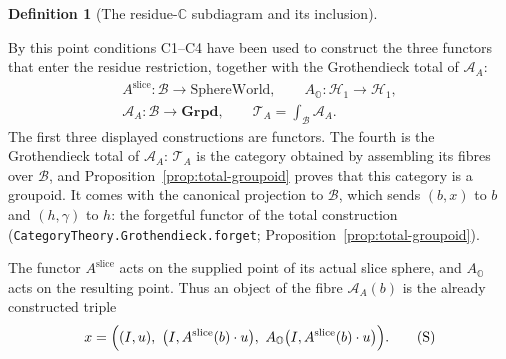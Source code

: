 \documentclass[11pt]{article}
\newcommand{\OO}{\mathbb{O}}
\newcommand{\CC}{\mathbb{C}}
\providecommand{\SphereWorld}{\mathrm{SphereWorld}}
\providecommand{\lean}[1]{}
\providecommand{\notready}{}
\providecommand{\uses}[1]{}
\theoremstyle{plain}
\theoremstyle{definition}
\newtheorem{definition}[theorem]{Definition}
\theoremstyle{remark}
\begin{document}
\begin{definition}[The residue-$\CC$ subdiagram and its inclusion]\label{def:residue-subdiagram}
\lean{ASection.CResidueZeroLocus, ASection.IsCResidueState,
ASection.AsectionCResidueDiagram,
ASection.AsectionCResidueInclusion}
\notready
\uses{def:base, def:A-section, lem:residue-spheres}
By this point conditions \textup{C1--C4} have been used to construct the
three functors that enter the residue restriction, together with the
Grothendieck total of $\mathcal A_A$:
\[
\begin{gathered}
 A^{\mathrm{slice}}:\mathcal B\longrightarrow\SphereWorld,
 \qquad
 A_{\OO}:\mathcal H_1\longrightarrow\mathcal H_1,\\
 \mathcal A_A:\mathcal B\longrightarrow\mathbf{Grpd},
 \qquad
 \mathcal T_A=\int_{\mathcal B}\mathcal A_A.
\end{gathered}                                      \tag{A}\label{eq:residue-built-objects}
\]
The first three displayed constructions are functors.  The fourth is the
Grothendieck total of $\mathcal A_A$: $\mathcal T_A$ is the category obtained
by assembling its fibres over $\mathcal B$, and
Proposition~\ref{prop:total-groupoid} proves that this category is a
groupoid.  It comes with the canonical projection to $\mathcal B$, which
sends $(b,x)$ to $b$ and $(h,\gamma)$ to $h$: the forgetful functor of the
total construction
(\texttt{CategoryTheory.Grothendieck.forget};
Proposition~\ref{prop:total-groupoid}).

The functor $A^{\mathrm{slice}}$ acts on the supplied point of its actual
slice sphere, and $A_{\OO}$ acts on the resulting point. Thus an object of
the fibre $\mathcal A_A(b)$ is the already constructed triple
\[
 x=\Bigl((I,u),\ \bigl(I,A^{\mathrm{slice}}(b)\mathbin{\cdot}u\bigr),\
 A_{\OO}\bigl(I,A^{\mathrm{slice}}(b)\mathbin{\cdot}u\bigr)\Bigr).
                                                        \tag{S}\label{eq:residue-state-recap}
\]


\end{definition}
\end{document}
